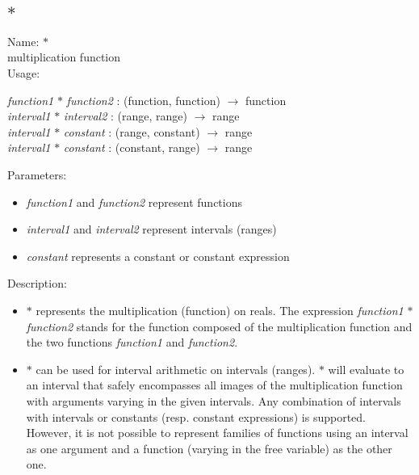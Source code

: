 \subsection{$*$}
\label{labmult}
\noindent Name: \textbf{$*$}\\
multiplication function\\
\noindent Usage: 
\begin{center}
\emph{function1} \textbf{$*$} \emph{function2} : (\textsf{function}, \textsf{function}) $\rightarrow$ \textsf{function}\\
\emph{interval1} \textbf{$*$} \emph{interval2} : (\textsf{range}, \textsf{range}) $\rightarrow$ \textsf{range}\\
\emph{interval1} \textbf{$*$} \emph{constant} : (\textsf{range}, \textsf{constant}) $\rightarrow$ \textsf{range}\\
\emph{interval1} \textbf{$*$} \emph{constant} : (\textsf{constant}, \textsf{range}) $\rightarrow$ \textsf{range}\\
\end{center}
Parameters: 
\begin{itemize}
\item \emph{function1} and \emph{function2} represent functions
\item \emph{interval1} and \emph{interval2} represent intervals (ranges)
\item \emph{constant} represents a constant or constant expression
\end{itemize}
\noindent Description: \begin{itemize}

\item \textbf{$*$} represents the multiplication (function) on reals. 
   The expression \emph{function1} \textbf{$*$} \emph{function2} stands for
   the function composed of the multiplication function and the two
   functions \emph{function1} and \emph{function2}.

\item \textbf{$*$} can be used for interval arithmetic on intervals
   (ranges). \textbf{$*$} will evaluate to an interval that safely
   encompasses all images of the multiplication function with arguments varying
   in the given intervals.  Any combination of intervals with intervals
   or constants (resp. constant expressions) is supported. However, it is
   not possible to represent families of functions using an interval as
   one argument and a function (varying in the free variable) as the
   other one.
\end{itemize}
